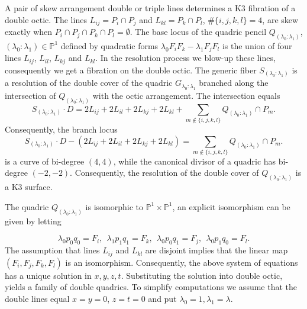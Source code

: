 \documentclass[12pt]{amsart}
\theoremstyle{plain}
\theoremstyle{remark}
\theoremstyle{definition}
\newcommand{\PP}{\mathbb P}
\numberwithin{table}{section}
\begin{document}
A pair of skew arrangement double or triple lines determines a K3 fibration of a double octic. The lines $L_{ij}=P_{i}\cap P_{j}$ and $L_{kl}=P_{k}\cap P_{l}$, $\#\{i,j,k,l\}=4$, are skew exactly when $P_{i}\cap P_{j}\cap P_{k}\cap P_{l}=\emptyset$. The base locus of the quadric pencil $Q_{(\lambda_{0}:\lambda_{1})}$, $(\lambda_{0}:\lambda_{1})\in\PP^{1}$ defined by quadratic forms $\lambda_{0}F_{i}F_{k}-\lambda_{1}F_{j}F_{l}$
is the union of four lines $L_{ij}$, $L_{il}$, $L_{kj}$ and $L_{kl}$. In the resolution process we blow-up these lines, consequently we get a fibration on the double octic. The generic fiber $S_{(\lambda_{0}:\lambda_{1})}$ is a resolution of the double cover of the quadric $G_{\lambda_{0}:\lambda_{1}}$ branched along the intersection of $Q_{(\lambda_{0}:\lambda_{1})}$ with the octic arrangement.
The intersection equals
\[S_{(\lambda_{0}:\lambda_{1})}\cdot D = 2L_{ij}+2L_{il}+2L_{kj}+2L_{kl}+\sum_{m\not\in\{i,j,k,l\}} Q_{(\lambda_{0}:\lambda_{1})}\cap P_{m}.\]
Consequently, the branch locus
\[
S_{(\lambda_{0}:\lambda_{1})}\cdot D - (2L_{ij}+2L_{il}+2L_{kj}+2L_{kl}) = \sum_{m\not\in\{i,j,k,l\}} Q_{(\lambda_{0}:\lambda_{1})}\cap P_{m}.
\]
is a curve of bi-degree $(4,4)$, while the canonical divisor of a quadric has bi-degree $(-2,-2)$. Consequently, the resolution of the double cover of $Q_{(\lambda_{0}:\lambda_{1})}$ is a K3 surface.

The quadric $Q_{(\lambda_{0}:\lambda_{1})}$ is isomorphic to $\PP^{1}\times \PP^{1}$, an explicit isomorphism can be given by letting

\[\lambda_{0} p_{0}q_{0}=F_{i}, \ \ \lambda_{1} p_{1}q_{1}=F_{k}, \ \ \lambda_{0}p_{0}q_{1}=F_{j}, \ \ \lambda_{0}p_{1}q_{0}=F_{l}.\]
The assumption that lines $L_{ij}$ and $L_{kl}$ are disjoint implies that the linear map $(F_{i},F_{j},F_{k},F_{l})$ is an isomorphism. Consequently, the above system of equations has a unique solution in $x,y,z,t$. Substituting the solution into double octic, yields a family of double quadrics.
To simplify computations we assume that the double lines equal  $x=y=0$, $z=t=0$ and put $\lambda_{0}=1, \lambda_{1}=\lambda$.
\end{document}

